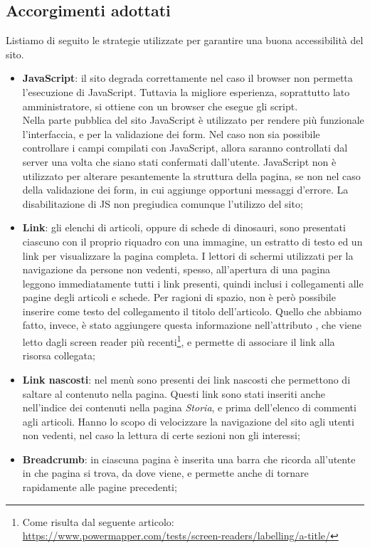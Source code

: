 \documentclass[12pt]{article}
\begin{document}
	\subsection{Accorgimenti adottati}
	Listiamo di seguito le strategie utilizzate per garantire una buona accessibilità del sito.
	\begin{itemize}
		\item \textbf{JavaScript}: il sito degrada correttamente nel caso il browser non permetta l'esecuzione di JavaScript. Tuttavia la migliore esperienza, soprattutto lato amministratore, si ottiene con un browser che esegue gli script. \\
		Nella parte pubblica del sito JavaScript è utilizzato per rendere più funzionale l'interfaccia, e per la validazione dei form. Nel caso non sia possibile controllare i campi compilati con JavaScript, allora saranno controllati dal server una volta che siano stati confermati dall'utente. JavaScript non è utilizzato per alterare pesantemente la struttura della pagina, se non nel caso della validazione dei form, in cui aggiunge opportuni messaggi d'errore. La disabilitazione di JS non pregiudica comunque l'utilizzo del sito;
		\item \textbf{Link}: gli elenchi di articoli, oppure di schede di dinosauri, sono presentati ciascuno con il proprio riquadro con una immagine, un estratto di testo ed un link per visualizzare la pagina completa. I lettori di schermi utilizzati per la navigazione da persone non vedenti, spesso, all'apertura di una pagina leggono immediatamente tutti i link presenti, quindi inclusi i collegamenti alle pagine degli articoli e schede.
		Per ragioni di spazio, non è però possibile inserire come testo del collegamento il titolo dell'articolo. Quello che abbiamo fatto, invece, è stato aggiungere questa informazione nell'attributo , che viene letto dagli screen reader più recenti\footnote{Come risulta dal seguente articolo: \url{https://www.powermapper.com/tests/screen-readers/labelling/a-title/}}, e permette di associare il link alla risorsa collegata;
		\item \textbf{Link nascosti}: nel menù sono presenti dei link nascosti che permettono di saltare al contenuto nella pagina. Questi link sono stati inseriti anche nell'indice dei contenuti nella pagina \textit{Storia}, e prima dell'elenco di commenti agli articoli. Hanno lo scopo di velocizzare la navigazione del sito agli utenti non vedenti, nel caso la lettura di certe sezioni non gli interessi;
		\item \textbf{Breadcrumb}: in ciascuna pagina è inserita una barra che ricorda all'utente in che pagina si trova, da dove viene, e permette anche di tornare rapidamente alle pagine precedenti;

\end{itemize}
\end{document}

